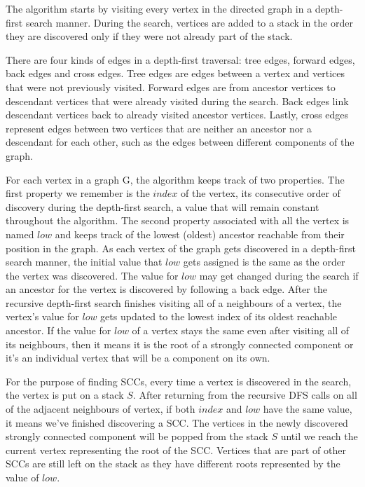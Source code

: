 \documentclass{l4proj}
\begin{document}
\noindent The algorithm starts by visiting every vertex in the directed graph in a depth-first search manner. During the search, vertices are added to a stack in the order they are discovered only if they were not already part of the stack.

\noindent There are four kinds of edges in a depth-first traversal: tree edges, forward edges, back edges and cross edges. Tree edges are edges between a vertex and vertices that were not previously visited. Forward edges are from ancestor vertices to descendant vertices that were already visited during the search. Back edges link descendant vertices back to already visited ancestor vertices. Lastly, cross edges represent edges between two vertices that are neither an ancestor nor a descendant for each other, such as the edges between different components of the graph. 

\noindent For each vertex in a graph G, the algorithm keeps track of two properties. The first property we remember is the $index$ of the vertex, its consecutive order of discovery during the depth-first search, a value that will remain constant throughout the algorithm. The second property associated with all the vertex is named $low$ and keeps track of the lowest (oldest) ancestor reachable from their position in the graph. As each vertex of the graph gets discovered in a depth-first search manner, the initial value that $low$ gets assigned is the same as the order the vertex was discovered. The value for $low$ may get changed during the search if an ancestor for the vertex is discovered by following a back edge. After the recursive depth-first search finishes visiting all of a neighbours of a vertex, the vertex's value for $low$ gets updated to the lowest index of its oldest reachable ancestor. If the value for $low$ of a vertex stays the same even after visiting all of its neighbours, then it means it is the root of a strongly connected component or it's an individual vertex that will be a component on its own.

\noindent For the purpose of finding SCCs, every time a vertex is discovered in the search, the vertex is put on a stack $S$. After returning from the recursive DFS calls on all of the adjacent neighbours of vertex, if both $index$ and $low$ have the same value, it means we've finished discovering a SCC. The vertices in the newly discovered strongly connected component will be popped from the stack $S$ until we reach the current vertex representing the root of the SCC. Vertices that are part of other SCCs are still left on the stack as they have different roots represented by the value of $low$.
\end{document}
